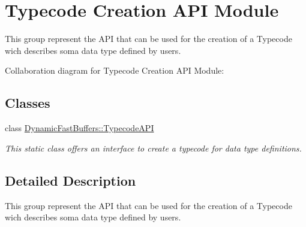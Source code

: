 \hypertarget{group___t_y_p_e_c_o_d_e_a_p_i_m_o_d_u_l_e}{\section{Typecode Creation A\-P\-I Module}
\label{group___t_y_p_e_c_o_d_e_a_p_i_m_o_d_u_l_e}
}


This group represent the A\-P\-I that can be used for the creation of a Typecode wich describes soma data type defined by users.  


Collaboration diagram for Typecode Creation A\-P\-I Module\-:
\subsection*{Classes}
\begin{DoxyCompactItemize}
\item 
class \hyperlink{class_dynamic_fast_buffers_1_1_typecode_a_p_i}{Dynamic\-Fast\-Buffers\-::\-Typecode\-A\-P\-I}
\begin{DoxyCompactList}\small\item\em This static class offers an interface to create a typecode for data type definitions. \end{DoxyCompactList}\end{DoxyCompactItemize}


\subsection{Detailed Description}
This group represent the A\-P\-I that can be used for the creation of a Typecode wich describes soma data type defined by users. 